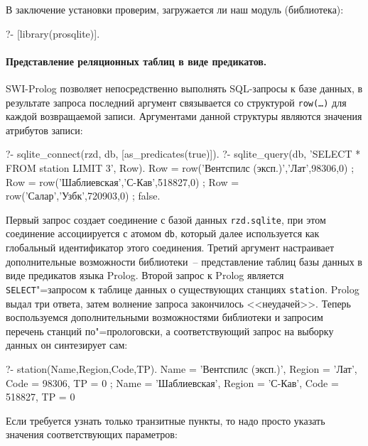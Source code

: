 \documentclass[a4paper,14pt, openany, twoside, final]{extbook} %
\begin{document}
В заключение установки проверим, загружается ли наш модуль (библиотека):

\begin{proexp}
?- [library(prosqlite)].
\end{proexp}
\pagebreak

\paragraph{Представление реляционных таблиц в виде предикатов.}  SWI-Prolog позволяет непосредственно выполнять SQL-запросы к базе данных, в результате запроса последний аргумент связывается со структурой \texttt{row(\ldots)} для каждой возвращаемой записи.  Аргументами данной структуры являются значения атрибутов записи:

\begin{proexp}
?- sqlite_connect(rzd, db, [as_predicates(true)]).
?- sqlite_query(db,
        'SELECT * FROM station LIMIT 3', Row).
Row = row('Вентспилс (эксп.)','Лат',98306,0) ;
Row = row('Шаблиевская','С-Кав',518827,0) ;
Row = row('Салар','Узбк',720903,0) ;
false.
\end{proexp}

\noindent{}Первый запрос создает соединение с базой данных \texttt{rzd.sqlite}, при этом соединение ассоциируется с атомом \texttt{db}, который далее используется как глобальный идентификатор этого соединения.  Третий аргумент настраивает дополнительные возможности библиотеки~--  представление таблиц базы данных в виде предикатов языка Prolog.  Второй запрос к Prolog является \foreignlanguage{english}{\texttt{SELECT}}"=запросом к таблице данных о существующих станциях \texttt{station}.  Prolog выдал три ответа, затем волнение запроса закончилось <<неудачей>>.  Теперь воспользуемся дополнительными возможностями библиотеки и запросим перечень станций по"=прологовски, а соответствующий запрос на выборку данных он синтезирует сам:

\begin{proexp}
?- station(Name,Region,Code,TP).
Name = 'Вентспилс (эксп.)',
Region = 'Лат',        %
Code = 98306,          %
TP = 0 ;               %
Name = 'Шаблиевская',  %
Region = 'С-Кав',
Code = 518827,
TP = 0
\end{proexp}


\noindent{}Если требуется узнать только транзитные пункты, то надо просто указать значения соответствующих параметров:
\end{document}
